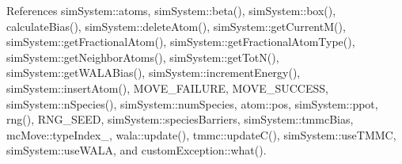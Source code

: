 References sim\-System\-::atoms, sim\-System\-::beta(), sim\-System\-::box(), calculate\-Bias(), sim\-System\-::delete\-Atom(), sim\-System\-::get\-Current\-M(), sim\-System\-::get\-Fractional\-Atom(), sim\-System\-::get\-Fractional\-Atom\-Type(), sim\-System\-::get\-Neighbor\-Atoms(), sim\-System\-::get\-Tot\-N(), sim\-System\-::get\-W\-A\-L\-A\-Bias(), sim\-System\-::increment\-Energy(), sim\-System\-::insert\-Atom(), M\-O\-V\-E\-\_\-\-F\-A\-I\-L\-U\-R\-E, M\-O\-V\-E\-\_\-\-S\-U\-C\-C\-E\-S\-S, sim\-System\-::n\-Species(), sim\-System\-::num\-Species, atom\-::pos, sim\-System\-::ppot, rng(), R\-N\-G\-\_\-\-S\-E\-E\-D, sim\-System\-::species\-Barriers, sim\-System\-::tmmc\-Bias, mc\-Move\-::type\-Index\-\_\-, wala\-::update(), tmmc\-::update\-C(), sim\-System\-::use\-T\-M\-M\-C, sim\-System\-::use\-W\-A\-L\-A, and custom\-Exception\-::what().


